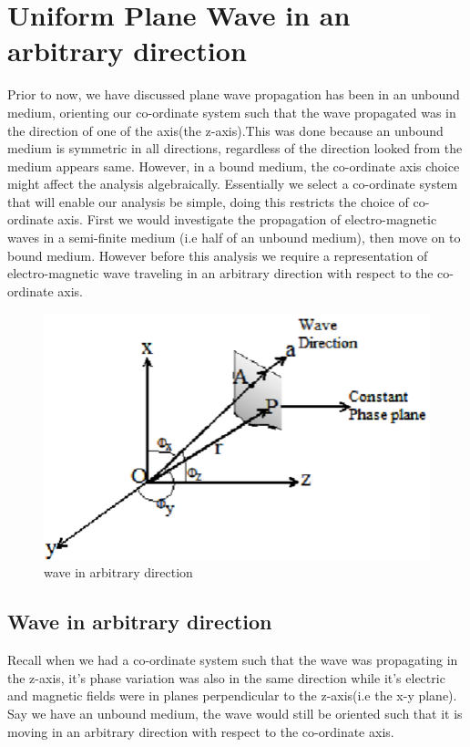 \chapter{Uniform Plane Wave in an arbitrary direction}\label{lec:lec29}

Prior to now, we have discussed  plane wave propagation has been in an unbound medium, orienting our co-ordinate system such that the wave propagated was in the direction of one of the axis(the z-axis).This was done because an unbound medium is symmetric in all directions, regardless of the direction looked from the medium appears same.
However, in a bound medium, the co-ordinate axis choice might affect the analysis algebraically.
Essentially we select a co-ordinate system that will enable our analysis be simple, doing this restricts the choice of co-ordinate axis. First we would investigate the propagation of electro-magnetic waves in a semi-finite medium (i.e half of an unbound medium), then move on to bound medium. However before this analysis we require a representation of electro-magnetic wave traveling in an arbitrary direction with respect to the co-ordinate axis.
\begin{figure}[h]
\centering
\includegraphics[scale=0.3]{./graphics/em-waves}
\caption{wave in arbitrary direction}
\end{figure}

\section{Wave in arbitrary direction}
Recall when we had a co-ordinate system such that the wave was propagating in the z-axis, it's phase variation was also in the same direction while it's electric and magnetic fields were in planes perpendicular to the z-axis(i.e the x-y plane).
Say we have an unbound medium, the wave would still be oriented such that it is moving in an arbitrary direction with respect to the co-ordinate axis.

